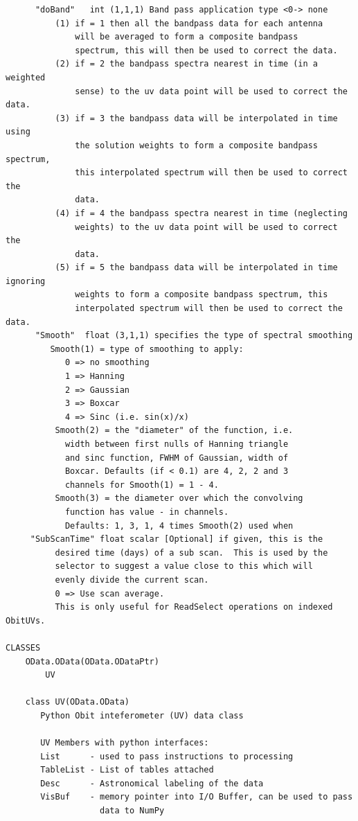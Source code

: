 \documentclass[11pt]{report}
\begin{document}
\begin{verbatim}
      "doBand"   int (1,1,1) Band pass application type <0-> none
          (1) if = 1 then all the bandpass data for each antenna
              will be averaged to form a composite bandpass
              spectrum, this will then be used to correct the data.
          (2) if = 2 the bandpass spectra nearest in time (in a weighted
              sense) to the uv data point will be used to correct the data.
          (3) if = 3 the bandpass data will be interpolated in time using
              the solution weights to form a composite bandpass spectrum,
              this interpolated spectrum will then be used to correct the
              data.
          (4) if = 4 the bandpass spectra nearest in time (neglecting
              weights) to the uv data point will be used to correct the
              data.
          (5) if = 5 the bandpass data will be interpolated in time ignoring
              weights to form a composite bandpass spectrum, this
              interpolated spectrum will then be used to correct the data.
      "Smooth"  float (3,1,1) specifies the type of spectral smoothing
         Smooth(1) = type of smoothing to apply:
            0 => no smoothing
            1 => Hanning
            2 => Gaussian
            3 => Boxcar
            4 => Sinc (i.e. sin(x)/x)
          Smooth(2) = the "diameter" of the function, i.e.
            width between first nulls of Hanning triangle
            and sinc function, FWHM of Gaussian, width of
            Boxcar. Defaults (if < 0.1) are 4, 2, 2 and 3
            channels for Smooth(1) = 1 - 4.
          Smooth(3) = the diameter over which the convolving
            function has value - in channels.
            Defaults: 1, 3, 1, 4 times Smooth(2) used when
     "SubScanTime" float scalar [Optional] if given, this is the 
          desired time (days) of a sub scan.  This is used by the 
          selector to suggest a value close to this which will
          evenly divide the current scan.  
          0 => Use scan average.
          This is only useful for ReadSelect operations on indexed ObitUVs.

CLASSES
    OData.OData(OData.ODataPtr)
        UV
    
    class UV(OData.OData)
       Python Obit inteferometer (UV) data class
       
       UV Members with python interfaces:
       List      - used to pass instructions to processing
       TableList - List of tables attached
       Desc      - Astronomical labeling of the data
       VisBuf    - memory pointer into I/O Buffer, can be used to pass
                   data to NumPy
       

\end{verbatim}
\end{document}
